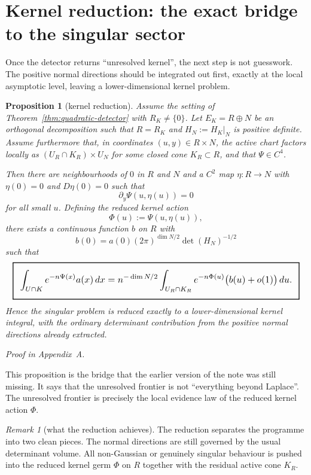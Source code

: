 \documentclass[11pt,a4paper]{article}
\numberwithin{equation}{section}
\newcommand{\geomboxed}[1]{%
  \setlength{\fboxsep}{8pt}%
  \setlength{\fboxrule}{0.9pt}%
  \fbox{\scalebox{1.12}{$\displaystyle #1$}}%
}
\theoremstyle{thmcompact}
\newtheorem{proposition}[theorem]{Proposition}
\theoremstyle{remark}
\newtheorem*{remarkplain}{Remark}
\newenvironment{remark}[1][]%
{\begin{remarkbox}\begin{remarkplain}[#1]\normalfont}
{\end{remarkplain}\end{remarkbox}}
\newcommand{\proofappendix}{\par{\hfill\scriptsize\emph{Proof in Appendix~A.}}\par}
\begin{document}
\section{Kernel reduction: the exact bridge to the singular sector}

Once the detector returns ``unresolved kernel'', the next step is not guesswork. The positive normal directions should be integrated out first, exactly at the local asymptotic level, leaving a lower-dimensional kernel problem.

\begin{proposition}[kernel reduction]\label{prop:kernel-reduction}
Assume the setting of Theorem~\ref{thm:quadratic-detector} with $R_K\neq\{0\}$. Let $E_K=R\oplus N$ be an orthogonal decomposition such that $R=R_K$ and $H_N:=H_K|_N$ is positive definite. Assume furthermore that, in coordinates $(u,y)\in R\times N$, the active chart factors locally as $(U_R\cap K_R)\times U_N$ for some closed cone $K_R\subset R$, and that $\Psi\in C^4$.

Then there are neighbourhoods of $0$ in $R$ and $N$ and a $C^2$ map $\eta:R\to N$ with $\eta(0)=0$ and $D\eta(0)=0$ such that
\[
\partial_y \Psi(u,\eta(u))=0
\]
for all small $u$. Defining the reduced kernel action
\[
\Phi(u):=\Psi(u,\eta(u)),
\]
there exists a continuous function $b$ on $R$ with
\[
b(0)=a(0)(2\pi)^{\dim N/2}\det(H_N)^{-1/2}
\]
such that
\[
\geomboxed{
\int_{U\cap K} e^{-n\Psi(x)}a(x)\,dx
=
 n^{-\dim N/2}
\int_{U_R\cap K_R} e^{-n\Phi(u)}\bigl(b(u)+o(1)\bigr)\,du.}
\]
Hence the singular problem is reduced exactly to a lower-dimensional kernel integral, with the ordinary determinant contribution from the positive normal directions already extracted.
\proofappendix
\end{proposition}

This proposition is the bridge that the earlier version of the note was still missing. It says that the unresolved frontier is not ``everything beyond Laplace''. The unresolved frontier is precisely the local evidence law of the reduced kernel action $\Phi$.

\begin{remark}[what the reduction achieves]
The reduction separates the programme into two clean pieces. The normal directions are still governed by the usual determinant volume. All non-Gaussian or genuinely singular behaviour is pushed into the reduced kernel germ $\Phi$ on $R$ together with the residual active cone $K_R$.
\end{remark}
\end{document}
